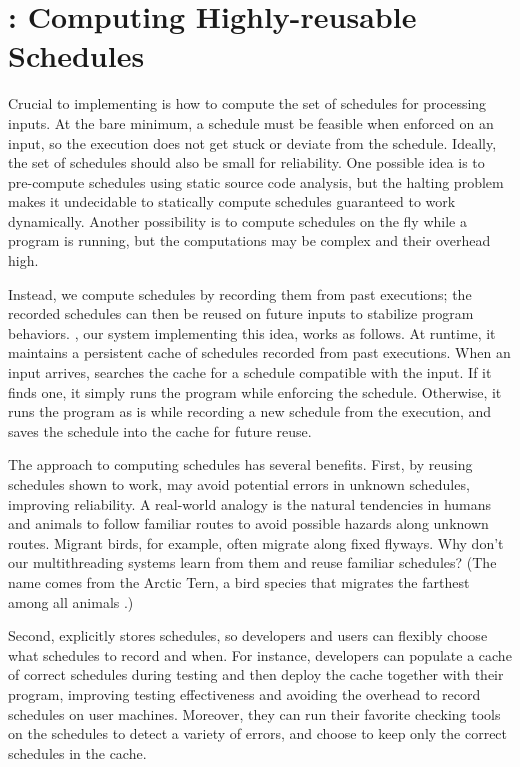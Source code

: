 

\section{\tern: Computing Highly-reusable Schedules} \label{sec:tern}


Crucial to implementing \smt is how to compute the set of schedules for
processing inputs.  At the bare minimum, a schedule must be feasible when
enforced on an input, so the execution does not get stuck or deviate from
the schedule.  Ideally, the set of schedules should also be small for
reliability.  One possible idea is to pre-compute schedules using static
source code analysis, but the halting problem makes it undecidable to
statically compute schedules guaranteed to work dynamically.  Another
possibility is to compute schedules on the fly while a program is running,
but the computations may be complex and their overhead high.

Instead, we compute schedules by recording them from past executions; the
recorded schedules can then be reused on future inputs to stabilize
program behaviors.  \tern, our system implementing this idea, works as
follows.  At runtime, it maintains a persistent cache of schedules
recorded from past executions.  When an input arrives, \tern searches the
cache for a schedule compatible with the input.  If it finds one, it
simply runs the program while enforcing the schedule.  Otherwise, it runs
the program as is while recording a new schedule from the execution, and
saves the schedule into the cache for future reuse.

The \tern approach to computing schedules has several benefits. First, by
reusing schedules shown to work, \tern may avoid potential errors in
unknown schedules, improving reliability.  A real-world analogy is the
natural tendencies in humans and animals to follow familiar routes to
avoid possible hazards along unknown routes.  Migrant birds, for example,
often migrate along fixed flyways.  Why don't our multithreading systems
learn from them and reuse familiar schedules?  (The name \tern comes from
the Arctic Tern, a bird species that migrates the farthest among all
animals%
.)

Second, \tern explicitly stores schedules, so developers and users can
flexibly choose what schedules to record and when.  For instance,
developers can populate a cache of correct schedules during testing and
then deploy the cache together with their program, improving testing
effectiveness and avoiding the overhead to record schedules on user
machines.  Moreover, they can run their favorite checking tools on the
schedules to detect a variety of errors, and choose to keep only the
correct schedules in the cache.

